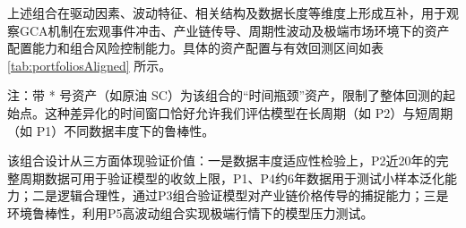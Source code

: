 上述组合在驱动因素、波动特征、相关结构及数据长度等维度上形成互补，用于观察GCA机制在宏观事件冲击、产业链传导、周期性波动及极端市场环境下的资产配置能力和组合风险控制能力。具体的资产配置与有效回测区间如表 \ref{tab:portfoliosAligned} 所示。

\begin{table}[htbp]
    \centering
    \caption{实验资产组合配置与有效对抗训练区间}
    \label{tab:portfoliosAligned}
    \begin{tablenotes}
        \footnotesize
        \item[*] 注：带 * 号资产（如原油 SC）为该组合的“时间瓶颈”资产，限制了整体回测的起始点。这种差异化的时间窗口恰好允许我们评估模型在长周期（如 P2）与短周期（如 P1）不同数据丰度下的鲁棒性。
    \end{tablenotes}
\end{table}

该组合设计从三方面体现验证价值：一是数据丰度适应性检验上，P2近20年的完整周期数据可用于验证模型的收敛上限，P1、P4约6年数据用于测试小样本泛化能力；二是逻辑合理性，通过P3组合验证模型对产业链价格传导的捕捉能力；三是环境鲁棒性，利用P5高波动组合实现极端行情下的模型压力测试。

